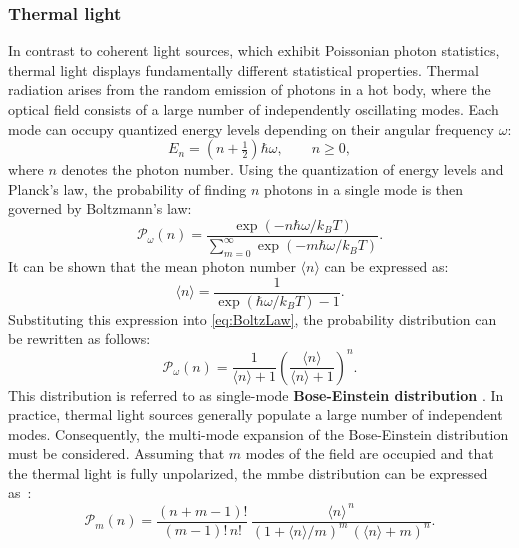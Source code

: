 \subsubsection{Thermal light}
In contrast to coherent light sources, which exhibit Poissonian photon statistics, thermal light displays fundamentally different statistical properties. Thermal radiation arises from the random emission of photons in a hot body, where the optical field consists of a large number of independently oscillating modes. Each mode can occupy quantized energy levels depending on their angular frequency $\omega$: 
\begin{equation}
	E_n = \left(n + \tfrac{1}{2}\right)\hbar \omega, 
	\qquad n \geq 0,
\end{equation}
where $n$ denotes the photon number. \newline
Using the quantization of energy levels and Planck's law,
the probability of finding $n$ photons in a single mode is then governed by Boltzmann’s law:
\begin{equation}
	\mathcal{P}_{\omega}(n) = \frac{\exp\!\left(-n\hbar\omega / k_B T\right)}
	{\sum_{m=0}^{\infty} \exp\!\left(-m\hbar\omega / k_B T\right)}.
	\label{eq:BoltzLaw}
\end{equation}
It can be shown that the mean photon number $\langle n\rangle$ can be expressed as:
\begin{equation}
	\langle n\rangle = \frac{1}{\exp\!\left(\hbar\omega / k_B T\right) -1}.
\end{equation}
Substituting this expression into \autoref{eq:BoltzLaw}, the probability distribution can be rewritten as follows:
\begin{equation}
	\mathcal{P}_{\omega}(n) = \frac{1}{\langle n\rangle+1}\left(\frac{\langle n\rangle}{\langle n\rangle+1}\right)^n.
	\label{eq:smBE}
\end{equation}
This distribution is referred to as single-mode \textbf{Bose-Einstein distribution} \cite{foxQuantumOpticsIntroduction2006}. \newline
In practice, thermal light sources generally populate a large number of independent modes. Consequently, the multi-mode expansion of the Bose-Einstein distribution must be considered. Assuming that $m$ modes of the field are occupied and that the thermal light is fully unpolarized, the \acrfull{mmbe} distribution can be expressed as~\cite{mandelOpticalCoherenceQuantum1995}:
\begin{equation}
	\mathcal{P}_m(n) = \frac{(n+m-1)!}{(m-1)!\,n!}\,
	\frac{\langle n\rangle^{\,n}}{\left(1+\langle n\rangle/m\right)^{m}\,\left(\langle n\rangle+m\right)^{n}}. 
	\label{eq:mmBE}
\end{equation}
